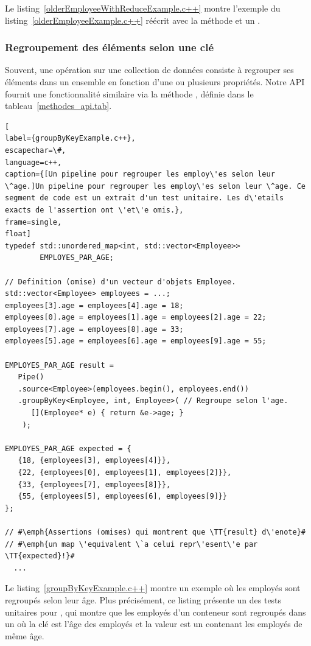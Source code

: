 Le listing~\ref{olderEmployeeWithReduceExample.c++} montre l'exemple du listing~\ref{olderEmployeeExample.c++} r\'e\'ecrit avec la m\'ethode  et un .


\subsubsection{Regroupement des \'el\'ements selon une cl\'e}

Souvent, une op\'eration sur une collection de donn\'ees consiste \`a regrouper ses \'el\'ements dans un ensemble en fonction d'une ou plusieurs propri\'et\'es. Notre {API} fournit une fonctionnalit\'e similaire via la m\'ethode , d\'efinie dans le tableau~\ref{methodes_api.tab}. 


\begin{lstlisting}[
label={groupByKeyExample.c++},
escapechar=\#,
language=c++,
caption={[Un pipeline pour regrouper les employ\'es selon leur \^age.]Un pipeline pour regrouper les employ\'es selon leur \^age. Ce segment de code est un extrait d'un test unitaire. Les d\'etails exacts de l'assertion ont \'et\'e omis.},
frame=single,
float]
typedef std::unordered_map<int, std::vector<Employee>> 
        EMPLOYES_PAR_AGE;

// Definition (omise) d'un vecteur d'objets Employee.
std::vector<Employee> employees = ...; 
employees[3].age = employees[4].age = 18;
employees[0].age = employees[1].age = employees[2].age = 22;
employees[7].age = employees[8].age = 33;
employees[5].age = employees[6].age = employees[9].age = 55;

EMPLOYES_PAR_AGE result = 
   Pipe()
   .source<Employee>(employees.begin(), employees.end())
   .groupByKey<Employee, int, Employee>( // Regroupe selon l'age.
      [](Employee* e) { return &e->age; } 
    );
    
EMPLOYES_PAR_AGE expected = {
   {18, {employees[3], employees[4]}},
   {22, {employees[0], employees[1], employees[2]}},
   {33, {employees[7], employees[8]}},
   {55, {employees[5], employees[6], employees[9]}}
};

// #\emph{Assertions (omises) qui montrent que \TT{result} d\'enote}#
// #\emph{un map \'equivalent \`a celui repr\'esent\'e par \TT{expected}!}#
  ...
\end{lstlisting}




Le listing~\ref{groupByKeyExample.c++} montre un exemple o\`u les employ\'es sont regroup\'es selon leur \^age. Plus pr\'ecis\'ement, ce listing pr\'esente un des tests unitaires pour , qui montre que les employ\'es d'un conteneur sont regroup\'es dans un  o\`u la cl\'e est l'\^age des employ\'es et la valeur est un  contenant les employ\'es de m\^eme \^age.
%

